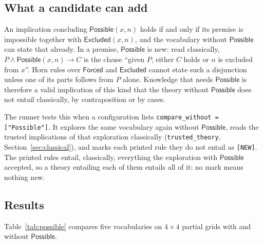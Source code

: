 \documentclass[11pt,a4paper]{article}
\theoremstyle{definition}
\theoremstyle{remark}
\newcommand{\code}[1]{\texttt{#1}}
\newcommand{\pred}[1]{\mathsf{#1}}
\newcommand{\Forced}{\pred{Forced}}
\newcommand{\Excluded}{\pred{Excluded}}
\begin{document}
\subsection{What a candidate can add}

An implication concluding $\pred{Possible}(x, n)$ holds if and only if its premise is impossible together with $\Excluded(x, n)$, and the vocabulary without $\pred{Possible}$ can state that already. In a premise, $\pred{Possible}$ is new: read classically, $P \wedge \pred{Possible}(x, n) \to C$ is the clause ``given $P$, either $C$ holds or $n$ is excluded from $x$''. Horn rules over $\Forced$ and $\Excluded$ cannot state such a disjunction unless one of its parts follows from $P$ alone. Knowledge that needs $\pred{Possible}$ is therefore a valid implication of this kind that the theory without $\pred{Possible}$ does not entail classically, by contraposition or by cases.

The runner tests this when a configuration lists \code{compare\_without = ["Possible"]}. It explores the same vocabulary again without $\pred{Possible}$, reads the trusted implications of that exploration classically (\code{trusted\_theory}, Section~\ref{sec:classical}), and marks each printed rule they do not entail as \texttt{[NEW]}. The printed rules entail, classically, everything the exploration with $\pred{Possible}$ accepted, so a theory entailing each of them entails all of it: no mark means nothing new.

\subsection{Results}\label{sec:possible-results}

Table~\ref{tab:possible} compares five vocabularies on $4 \times 4$ partial grids with and without $\pred{Possible}$.
\end{document}
